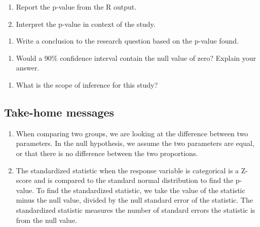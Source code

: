 \documentclass[
]{report}
\providecommand{\tightlist}{%
  \setlength{\itemsep}{0pt}\setlength{\parskip}{0pt}}
\begin{document}
\begin{enumerate}
\def\labelenumi{\arabic{enumi}.}
\setcounter{enumi}{8}
\item
  Report the p-value from the R output.
  \vspace{0.2in}
\item
  Interpret the p-value in context of the study.
\end{enumerate}

\vspace{1in}

\begin{enumerate}
\def\labelenumi{\arabic{enumi}.}
\setcounter{enumi}{10}
\tightlist
\item
  Write a conclusion to the research question based on the p-value found.
\end{enumerate}

\vspace{0.8in}

\begin{enumerate}
\def\labelenumi{\arabic{enumi}.}
\setcounter{enumi}{11}
\tightlist
\item
  Would a 90\% confidence interval contain the null value of zero? Explain your answer.
\end{enumerate}

\vspace{0.8in}

\begin{enumerate}
\def\labelenumi{\arabic{enumi}.}
\setcounter{enumi}{12}
\tightlist
\item
  What is the scope of inference for this study?
\end{enumerate}

\newpage

\newpage

\hypertarget{take-home-messages-15}{%
\subsection{Take-home messages}\label{take-home-messages-15}}

\begin{enumerate}
\def\labelenumi{\arabic{enumi}.}
\item
  When comparing two groups, we are looking at the difference between two parameters. In the null hypothesis, we assume the two parameters are equal, or that there is no difference between the two proportions.
\item
  The standardized statistic when the response variable is categorical is a Z-score and is compared to the standard normal distribution to find the p-value. To find the standardized statistic, we take the value of the statistic minus the null value, divided by the null standard error of the statistic. The standardized statistic measures the number of standard errors the statistic is from the null value.
\end{enumerate}
\end{document}
